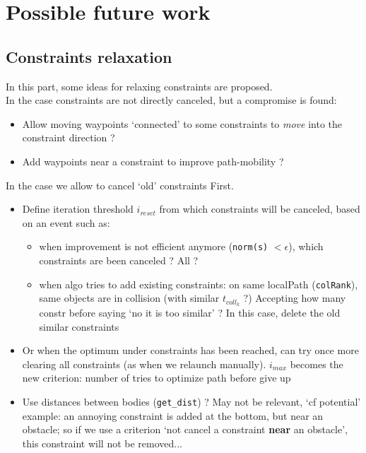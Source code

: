 \documentclass {article}
\newcommand\tcollk{t_{coll_k}}
\begin{document}
\vspace{0.2cm}




\newpage

\section{Possible future work}

\subsection{Constraints relaxation}
In this part, some ideas for relaxing constraints are proposed.\\
In the case constraints are not directly canceled, but a compromise is found:
\begin{itemize}
\item Allow moving waypoints `connected' to some constraints to \textit{move} into the 
constraint direction ?
\item Add waypoints near a constraint to improve path-mobility ?
\end{itemize}

\vspace{0.4cm}
In the case we allow to cancel `old' constraints First.
\begin{itemize}
\item Define iteration threshold $i_{reset}$ from which constraints will be
canceled, based on an event such as:

\begin{itemize}
\item when improvement is not efficient anymore (\texttt{norm(s)} $< \epsilon$), which constraints are been canceled ? All ?
\item when algo tries to add existing constraints: on same localPath (\texttt{colRank}), 
same objects are in collision (with similar $\tcollk$ ?) Accepting how many constr before 
saying `no it is too similar' ? In this case, delete the old similar constraints
\end{itemize}

\item Or when the optimum under constraints has been reached, can try once more clearing all constraints 
(as when we relaunch manually). $i_{max}$ becomes the new criterion: number of tries to optimize path before give up

\item Use distances between bodies (\texttt{get\_dist}) ? May not be relevant, `cf potential' 
example: an annoying constraint is added at the bottom, but near an obstacle; so if we use a criterion `not cancel a constraint \textbf{near} an obstacle', this constraint will not be removed...

\end{itemize}
\end{document}
